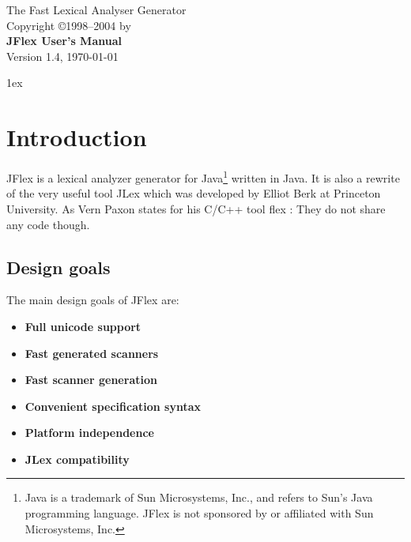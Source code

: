 \documentclass[11pt]{scrartcl}
\newcommand{\ver}{1.4}
\begin{document}


\begin{center}
\sffamily
{\Large The Fast Lexical Analyser Generator}\\
\smallskip\smallskip
Copyright \copyright 1998--2004 by \\
\bigskip
{\Huge \sffamily \bfseries JFlex User's Manual}\\
\bigskip
Version \ver, {\today}
\end{center}

\tableofcontents
\vfill
\newpage
\parindent0pt\parskip1ex
\pagestyle{headings}
\section{Introduction\label{Intro}}
JFlex is a lexical analyzer generator for Java\footnote{Java is a trademark of 
Sun Microsystems, Inc., and refers to Sun's Java programming language. 
JFlex is not sponsored by or affiliated with Sun Microsystems, Inc.}
written in Java. It is also a rewrite of the very useful tool JLex \cite{JLex} which
was developed by Elliot Berk at Princeton University. As Vern Paxon states
for his C/C++ tool flex \cite{flex}: They do not share any code though.

\subsection{Design goals}
The main design goals of JFlex are:
\begin{itemize}
\item {\bf Full unicode support}
\item {\bf Fast generated scanners }
\item {\bf Fast scanner generation}
\item {\bf Convenient specification syntax}
\item {\bf Platform independence}
\item {\bf JLex compatibility}
\end{itemize}
\end{document}
